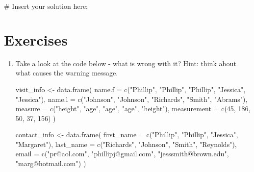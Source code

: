 \documentclass[
  letterpaper,
]{krantz}
\makeatletter
\newenvironment{Shaded}{\begin{snugshade}}{\end{snugshade}}
\newcommand{\AttributeTok}[1]{\textcolor[rgb]{0.40,0.45,0.13}{#1}}
\newcommand{\CommentTok}[1]{\textcolor[rgb]{0.37,0.37,0.37}{#1}}
\newcommand{\DecValTok}[1]{\textcolor[rgb]{0.68,0.00,0.00}{#1}}
\newcommand{\FunctionTok}[1]{\textcolor[rgb]{0.28,0.35,0.67}{#1}}
\newcommand{\NormalTok}[1]{\textcolor[rgb]{0.00,0.23,0.31}{#1}}
\newcommand{\OtherTok}[1]{\textcolor[rgb]{0.00,0.23,0.31}{#1}}
\newcommand{\StringTok}[1]{\textcolor[rgb]{0.13,0.47,0.30}{#1}}
\newenvironment{kframe}{%
\medskip{}
\setlength{\fboxsep}{.8em}
 \def\at@end@of@kframe{}%
 \ifinner\ifhmode%
  \def\at@end@of@kframe{\end{minipage}}%
  \begin{minipage}{\columnwidth}%
 \fi\fi%
 \def\FrameCommand##1{\hskip\@totalleftmargin \hskip-\fboxsep
 \colorbox{shadecolor}{##1}\hskip-\fboxsep
     \hskip-\linewidth \hskip-\@totalleftmargin \hskip\columnwidth}%
 \MakeFramed {\advance\hsize-\width
   \@totalleftmargin\z@ \linewidth\hsize
   \@setminipage}}%
 {\par\unskip\endMakeFramed%
 \at@end@of@kframe}
\renewenvironment{Shaded}{\begin{kframe}}{\end{kframe}}
\makeatother
\begin{document}
\begin{Shaded}
\begin{Highlighting}[]
\CommentTok{\# Insert your solution here:}
\end{Highlighting}
\end{Shaded}

\section{Exercises}\label{exercises-4}

\begin{enumerate}
\def\labelenumi{\arabic{enumi}.}
\item
  Take a look at the code below - what is wrong with it? Hint: think
  about what causes the warning message.

\begin{Shaded}
\begin{Highlighting}[]
\NormalTok{visit\_info }\OtherTok{\textless{}{-}} \FunctionTok{data.frame}\NormalTok{(}
  \AttributeTok{name.f =} \FunctionTok{c}\NormalTok{(}\StringTok{"Phillip"}\NormalTok{, }\StringTok{"Phillip"}\NormalTok{, }\StringTok{"Phillip"}\NormalTok{, }\StringTok{"Jessica"}\NormalTok{, }
             \StringTok{"Jessica"}\NormalTok{),}
  \AttributeTok{name.l =} \FunctionTok{c}\NormalTok{(}\StringTok{"Johnson"}\NormalTok{, }\StringTok{"Johnson"}\NormalTok{, }\StringTok{"Richards"}\NormalTok{, }\StringTok{"Smith"}\NormalTok{, }\StringTok{"Abrams"}\NormalTok{),}
  \AttributeTok{measure =} \FunctionTok{c}\NormalTok{(}\StringTok{"height"}\NormalTok{, }\StringTok{"age"}\NormalTok{, }\StringTok{"age"}\NormalTok{, }\StringTok{"age"}\NormalTok{, }\StringTok{"height"}\NormalTok{),}
  \AttributeTok{measurement =} \FunctionTok{c}\NormalTok{(}\DecValTok{45}\NormalTok{, }\DecValTok{186}\NormalTok{, }\DecValTok{50}\NormalTok{, }\DecValTok{37}\NormalTok{, }\DecValTok{156}\NormalTok{)}
\NormalTok{)}

\NormalTok{contact\_info }\OtherTok{\textless{}{-}} \FunctionTok{data.frame}\NormalTok{(}
\AttributeTok{first\_name =} \FunctionTok{c}\NormalTok{(}\StringTok{"Phillip"}\NormalTok{, }\StringTok{"Phillip"}\NormalTok{, }\StringTok{"Jessica"}\NormalTok{, }\StringTok{"Margaret"}\NormalTok{),}
\AttributeTok{last\_name =} \FunctionTok{c}\NormalTok{(}\StringTok{"Richards"}\NormalTok{, }\StringTok{"Johnson"}\NormalTok{, }\StringTok{"Smith"}\NormalTok{, }\StringTok{"Reynolds"}\NormalTok{),}
\AttributeTok{email =} \FunctionTok{c}\NormalTok{(}\StringTok{"pr@aol.com"}\NormalTok{, }\StringTok{"phillipj@gmail.com"}\NormalTok{, }
          \StringTok{"jesssmith@brown.edu"}\NormalTok{, }\StringTok{"marg@hotmail.com"}\NormalTok{)}
\NormalTok{)}


\end{Highlighting}
\end{Shaded}
\end{enumerate}
\end{document}
